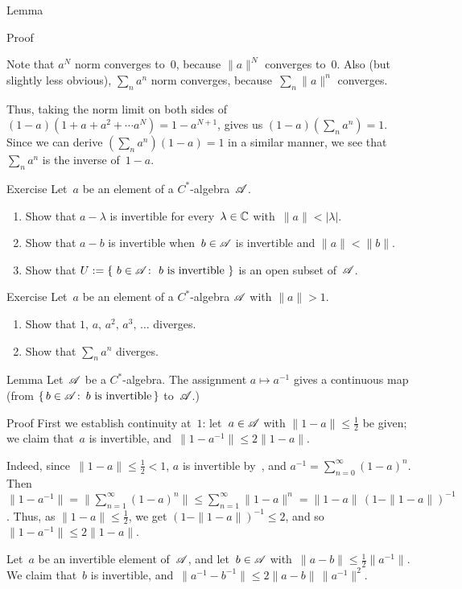 \documentclass[a]{subfiles}
\begin{document}
\begin{parsec}
\begin{point}[geometric]{Lemma}
\begin{point}{Proof}
\begin{point}%
Note that $a^N$ norm converges to~$0$,
because $\|a\|^N$ converges to~$0$.
Also (but slightly less obvious),
$\sum_n a^n$ norm converges,
because~$\sum_n \|a\|^n$ converges.
\end{point}
\begin{point}%
Thus, taking the norm limit
on both sides of $(1-a)(1+a+a^2+\dotsb a^N) = 1-a^{N+1}$,
gives us $(1-a)(\sum_n a^n) = 1$.
Since we can derive $(\sum_n a^n)(1-a) = 1$
in a similar manner, 
we see that $\sum_n a^n$ is the inverse of~$1-a$.
\end{point}
\end{point}
\end{point}
\begin{point}{Exercise}
Let~$a$ be an element of a $C^*$-algebra~$\mathscr{A}$.
\begin{enumerate}
\item
Show that $a-\lambda$ is invertible
for every~$\lambda\in\mathbb{C}$ with~$\|a\|< \left|\lambda\right|$.
\item
Show that $a-b$ is invertible
when~$b\in\mathscr{A}$ is invertible and $\|a\| < \|b\|$.
\item
Show that $U:=\{\ b\in\scrA\colon\ \text{$b$ is invertible}\ \}$
is an open subset of~$\mathscr{A}$.
\end{enumerate}
\end{point}
\begin{point}{Exercise}%
Let~$a$ be an element of a $C^*$-algebra $\mathscr{A}$ with $\|a\|>1$.
\begin{enumerate}
\item
Show that $1,\,a,\,a^2,\,a^3,\,\dotsc$ diverges.
\item
Show that $\sum_n a^n$ diverges.
\end{enumerate}
\end{point}
\begin{point}{Lemma}%
Let~$\mathscr{A}$ be a $C^*$-algebra.
The assignment $a\mapsto a^{-1}$
gives a  continuous map
(from $\{\,b\in \mathscr{A}\colon\, \text{$b$ is invertible}\,\}$
to~$\mathscr{A}$.)
\begin{point}{Proof}
First we establish continuity at~$1$:
let~$a\in\mathscr{A}$ with $\|1-a\|\leq \frac{1}{2}$ be given;
we claim that~$a$ is invertible,
and~$\|1-a^{-1}\| \leq 2\|1-a\|$.

Indeed, since~$\|1-a\|\leq \frac{1}{2}<1$,
$a$ is invertible by~,
and $a^{-1}=\sum_{n=0}^\infty (1-a)^n$.
Then~$\|1-a^{-1}\|=\|\sum_{n=1}^\infty (1-a)^n\|\leq \sum_{n=1}^\infty \|1-a\|^n
= \|1-a\|\, (1-\|1-a\|)^{-1}$.
Thus, as $\|1-a\|\leq\frac{1}{2}$,
we get $(1-\|1-a\|)^{-1}\leq 2$,
and so $\|1-a^{-1}\|\leq 2\|1-a\|$.
\begin{point}%
Let~$a$ be an invertible element of~$\mathscr{A}$,
and let~$b\in\mathscr{A}$ with~$\|a-b\|\leq\frac{1}{2}\|a^{-1}\|$.
We claim that~$b$ is invertible,
and~$\|a^{-1}-b^{-1}\|\leq 2\|a-b\|\,\|a^{-1}\|^2$.


\end{point}
\end{point}
\end{point}
\end{parsec}
\end{document}
